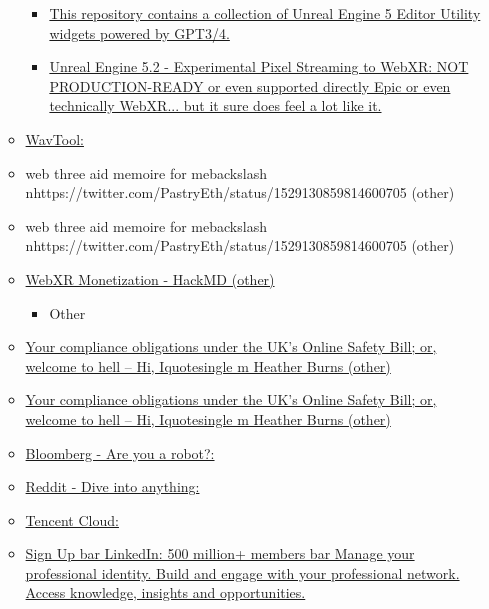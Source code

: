 \begin{itemize}
\begin{itemize}
    \begin{itemize}
     
    \item
      \href{https://github.com/TREE-Ind/UnrealGPT}{This repository
      contains a collection of Unreal Engine 5 Editor Utility widgets
      powered by GPT3/4.}
    \item
      \href{https://www.youtube.com/watch?v=FQgsQLodcZM}{Unreal Engine
      5.2 - Experimental Pixel Streaming to WebXR: NOT PRODUCTION-READY
      or even supported directly Epic or even technically WebXR... but
      it sure does feel a lot like it.}
    \end{itemize}
  \item
    \href{http://WavTool.com}{WavTool:}
  \item
    web three aid memoire for
    mebackslash nhttps://twitter.com/PastryEth/status/1529130859814600705
    (other)
  \item
    web three aid memoire for
    mebackslash nhttps://twitter.com/PastryEth/status/1529130859814600705
    (other)
  \item
    \href{https://hackmd.io/@xr/monetization}{WebXR Monetization -
    HackMD (other)}

    \begin{itemize}
     
    \item
      Other
    \end{itemize}
  \item
    \href{https://webdevlaw.uk/2022/07/11/your-compliance-obligations-under-the-uks-online-safety-bill/}{Your
    compliance obligations under the UK's Online Safety Bill; or,
    welcome to hell -- Hi, Iquotesingle m Heather Burns (other)}
  \item
    \href{https://webdevlaw.uk/2022/07/11/your-compliance-obligations-under-the-uks-online-safety-bill/}{Your
    compliance obligations under the UK's Online Safety Bill; or,
    welcome to hell -- Hi, Iquotesingle m Heather Burns (other)}
  \item
    \href{https://www.bloomberg.com/news/articles/2023-02-21/amazon-s-aws-joins-with-ai-startup-hugging-face-as-chatgpt-competition-heats-up}{Bloomberg
    - Are you a robot?:}
  \item
    \href{https://www.reddit.com/r/CryptoCurrency/comments/10wx51p/the_current_list_of_cbdcs_in_development_around/}{Reddit
    - Dive into anything:}
  \item
    \href{https://www.tencentcloud.com/dynamic/news-details/100437?lang=en\&pg=}{Tencent
    Cloud:}
  \item
    \href{https://www.linkedin.com/posts/activity-7046131519802757120-uUEf?utm_source=share\&utm_medium=member_android}{Sign
    Up bar{} LinkedIn: 500 million+ members bar{} Manage your
    professional identity. Build and engage with your professional
    network. Access knowledge, insights and opportunities.}


\end{itemize}
\end{itemize}
